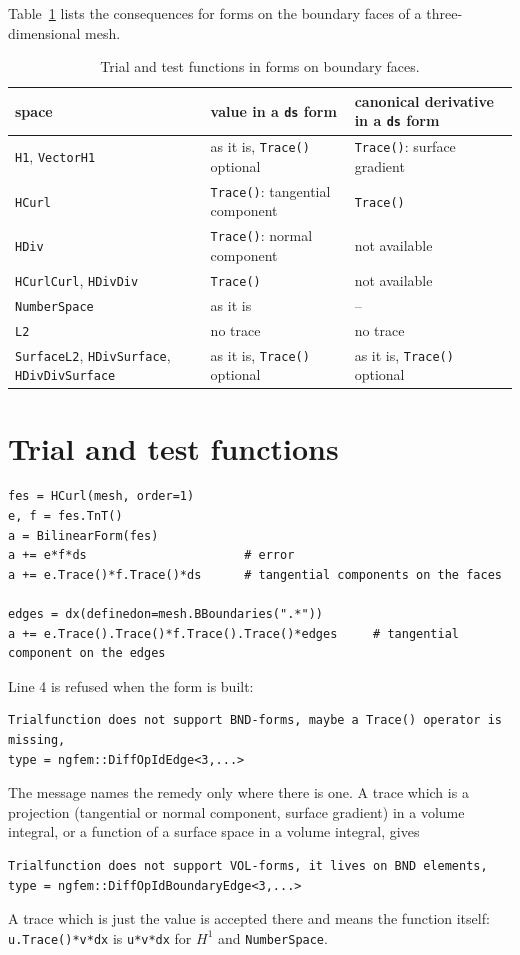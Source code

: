 \documentclass[10pt,a4paper]{article}
\newcommand{\code}[1]{\texttt{#1}}
\begin{document}
Table~\ref{tab:spaces} lists the consequences for forms on the boundary faces of a three-dimensional mesh.

\begin{table}[h]\centering\small
\begin{tabular}{@{}lll@{}}\toprule
space & value in a \code{ds} form & canonical derivative in a \code{ds} form \\\midrule
\code{H1}, \code{VectorH1} & as it is, \code{Trace()} optional & \code{Trace()}: surface gradient \\
\code{HCurl} & \code{Trace()}: tangential component & \code{Trace()} \\
\code{HDiv} & \code{Trace()}: normal component & not available \\
\code{HCurlCurl}, \code{HDivDiv} & \code{Trace()} & not available \\
\code{NumberSpace} & as it is & -- \\
\code{L2} & no trace & no trace \\\midrule
\code{SurfaceL2}, \code{HDivSurface}, \code{HDivDivSurface} & as it is, \code{Trace()} optional & as it is, \code{Trace()} optional \\\bottomrule
\end{tabular}
\caption{Trial and test functions in forms on boundary faces.}\label{tab:spaces}
\end{table}

\section{Trial and test functions}

\begin{lstlisting}
fes = HCurl(mesh, order=1)
e, f = fes.TnT()
a = BilinearForm(fes)
a += e*f*ds                      # error
a += e.Trace()*f.Trace()*ds      # tangential components on the faces

edges = dx(definedon=mesh.BBoundaries(".*"))
a += e.Trace().Trace()*f.Trace().Trace()*edges     # tangential component on the edges
\end{lstlisting}
Line 4 is refused when the form is built:
\begin{lstlisting}[numbers=none,xleftmargin=0pt,language={}]
Trialfunction does not support BND-forms, maybe a Trace() operator is missing,
type = ngfem::DiffOpIdEdge<3,...>
\end{lstlisting}
The message names the remedy only where there is one. A trace which is a projection (tangential or normal component, surface gradient) in a volume integral, or a function of a surface space in a volume integral, gives
\begin{lstlisting}[numbers=none,xleftmargin=0pt,language={}]
Trialfunction does not support VOL-forms, it lives on BND elements,
type = ngfem::DiffOpIdBoundaryEdge<3,...>
\end{lstlisting}
A trace which is just the value is accepted there and means the function itself: \code{u.Trace()*v*dx} is \code{u*v*dx} for $H^1$ and \code{NumberSpace}.
\end{document}
